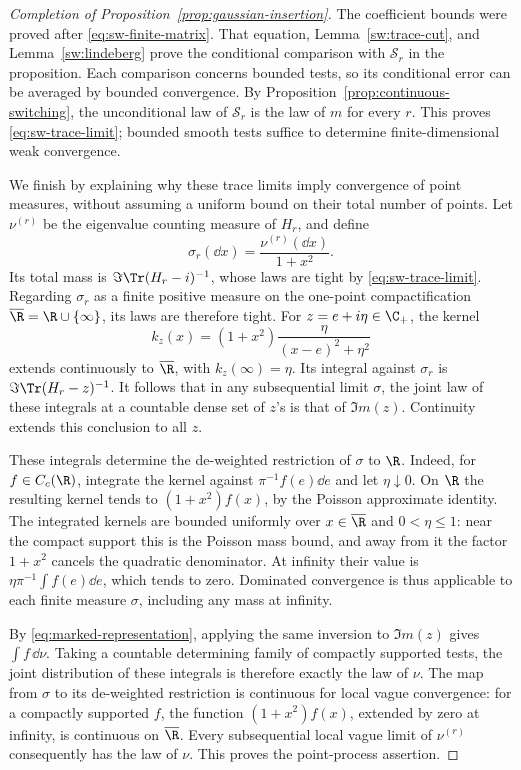 \begin{proof}[Completion of Proposition~\ref{prop:gaussian-insertion}]
The coefficient bounds were proved after \eqref{eq:sw-finite-matrix}.
That equation, Lemma~\ref{sw:trace-cut}, and Lemma~\ref{sw:lindeberg} prove
the conditional comparison with \(\mathcal S_r\) in the proposition.
Each comparison concerns bounded tests, so its conditional error can be
averaged by bounded convergence. By
Proposition~\ref{prop:continuous-switching}, the unconditional law of
\(\mathcal S_r\) is the law of \(m\) for every \(r\). This proves
\eqref{eq:sw-trace-limit}; bounded smooth tests suffice to determine
finite-dimensional weak convergence.

We finish by explaining why these trace limits imply convergence of point
measures, without assuming a uniform bound on their total number of
points. Let \(\nu^{(r)}\) be the eigenvalue counting measure of \(H_r\), and
define
\[
 \sigma_r(\dd x)=\frac{\nu^{(r)}(\dd x)}{1+x^2}.
\]
Its total mass is \(\Im\Tr(H_r-i)^{-1}\), whose laws are tight by
\eqref{eq:sw-trace-limit}. Regarding \(\sigma_r\) as a finite positive
measure on the one-point compactification
\(\overline{\R}=\R\cup\{\infty\}\), its laws are therefore tight.
For \(z=e+i\eta\in\C_+\), the kernel
\[
 k_z(x)=(1+x^2)\frac{\eta}{(x-e)^2+\eta^2}
\]
extends continuously to \(\overline{\R}\), with \(k_z(\infty)=\eta\).
Its integral against \(\sigma_r\) is \(\Im\Tr(H_r-z)^{-1}\).
It follows that in any subsequential limit \(\sigma\), the joint law of
these integrals at a countable dense set of \(z\)'s is that of
\(\Im m(z)\). Continuity extends this conclusion to all \(z\).

These integrals determine the de-weighted restriction of \(\sigma\) to
\(\R\). Indeed, for \(f\in C_c(\R)\), integrate the kernel against
\(\pi^{-1}f(e)\dd e\) and let \(\eta\downarrow0\). On \(\R\) the resulting
kernel tends to \((1+x^2)f(x)\), by the Poisson approximate identity.
The integrated kernels are bounded uniformly over
\(x\in\overline{\R}\) and \(0<\eta\le1\): near the compact support this is
the Poisson mass bound, and away from it the factor \(1+x^2\) cancels
the quadratic denominator. At infinity their value is
\(\eta\pi^{-1}\int f(e)\dd e\), which tends to zero.
Dominated convergence is thus applicable to each finite measure
\(\sigma\), including any mass at infinity.

By \eqref{eq:marked-representation}, applying the same inversion to
\(\Im m(z)\) gives \(\int f\,\dd\nu\). Taking a countable determining
family of compactly supported tests, the joint distribution of these
integrals is therefore exactly the law of \(\nu\).
The map from \(\sigma\) to its de-weighted restriction is continuous for
local vague convergence: for a compactly supported \(f\), the function
\((1+x^2)f(x)\), extended by zero at infinity, is continuous on
\(\overline{\R}\). Every subsequential local vague limit of
\(\nu^{(r)}\) consequently has the law of \(\nu\).
This proves the point-process assertion.
\end{proof}

